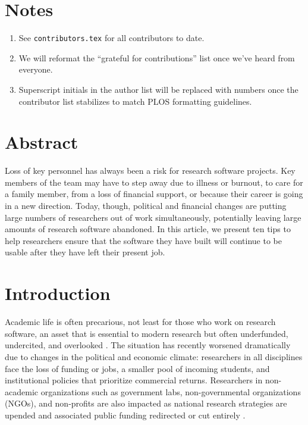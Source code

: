 \documentclass[10pt,letterpaper]{article}
\begin{document}
\section*{Notes}

\begin{enumerate}
\item
  See \texttt{contributors.tex} for all contributors to date.
\item
  We will reformat the ``grateful for contributions'' list once we've heard from everyone.
\item
  Superscript initials in the author list will be replaced with numbers once the contributor list stabilizes to match PLOS formatting guidelines.
\end{enumerate}

\section*{Abstract}

Loss of key personnel has always been a risk for research software projects.
Key members of the team may have to step away due to illness or burnout,
to care for a family member,
from a loss of financial support,
or because their career is going in a new direction.
Today,
though,
political and financial changes are putting large numbers of researchers out of work simultaneously,
potentially leaving large amounts of research software abandoned.
In this article,
we present ten tips to help researchers ensure that
the software they have built will continue to be usable
after they have left their present job.

\linenumbers

\section*{Introduction}

Academic life is often precarious,
not least for those who work on research software,
an asset that is essential to modern research \cite{Pearson2025}
but often underfunded, undercited, and overlooked \cite{Carver2022}.
The situation has recently worsened dramatically due to changes in the political and economic climate:
researchers in all disciplines face the loss of funding or jobs,
a smaller pool of incoming students,
and institutional policies that prioritize commercial returns.
Researchers in non-academic organizations
such as government labs, non-governmental organizations (NGOs), and non-profits are also impacted \cite{Woodward2025}
as national research strategies are upended
and associated public funding redirected or cut entirely \cite{Nature2025}.
\end{document}
